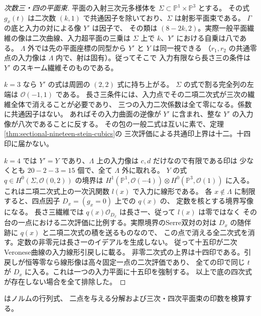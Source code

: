 \begin{proof}[次数三・四の平面束]
平面の入射三次元多様体を $\Sigma\subset\mathbb P^1\times\mathbb P^3$ とする。
その式 $g_x(t)$ は二次数 $(k,1)$ で共通因子を除いており、$\Sigma$ は射影平面束である。
$\Gamma$ の底と入力の対による像 $Y'$ は因子で、
その類は $(8-2k,2)$。実際一般平面繊維の像は二次曲線、入力超平面の三乗は
$\Sigma$ 上で $k$、$Y'$ における自乗は八である。
$\Lambda$ 外では先の平面座標の同型から $Y'$ と $Y$ は同一視できる
（$r_1,r_2$ の共通零点の入力像は $\Lambda$ 内で、射は固有）。従ってそこで
入力有限なら長さ三の条件は $Y'$ のスキーム繊維そのものである。

$k=3$ なら $Y'$ の式は周囲の $(2,2)$ 式に持ち上がる。
$\Sigma$ の式で割る完全列の左端は $\mathcal O(-1,1)$ である。
長さ三条件には、入力点でその二項二次式が三次の繊維全体で消えることが必要であり、
三つの入力二次係数は全て零になる。係数に共通因子はない。
あればその入力曲面の逆像が $Y'$ に含まれ、整な $Y'$ の入力像が八次であることに反する。
その包の一般二式は互いに素で、定理\ref{thm:sectional-nineteen-stein-cubics}の
三次評価による共通印上界は十二。十四印に届かない。

$k=4$ では $Y'=Y$ であり、$\Lambda$ 上の入力像は $c,d$ だけなので有限である印は
少なくとも $20-2-3=15$ 個で、全て $\Lambda$ 外に取れる。
$Y$ の式 $q\in H^0(\Sigma,\mathcal O(0,2))$ の境界は
$H^1(\mathbb P^1,\mathcal O(-4))\otimes H^0(\mathbb P^3,\mathcal O(1))$
に入る。これは二項二次式上の一次汎関数 $l(x)$ で入力に線形である。
各 $x\notin\Lambda$ に制限すると、四点因子 $D_x=(g_x=0)$ 上での $q(x)$ の、
定数を核とする境界写像になる。
長さ三繊維では $q(x)\mathcal O_{D_x}$ は長さ一、従って $l(x)$ は零ではなく
その台の一点における二次評価に比例する。実際境界のSerre双対の対は
$D_x$ の随伴跡に $q(x)$ と二項二次式の積を送るものなので、
この点で消える全二次式を消す。定数の非零元は長さ一のイデアルを生成しない。
従って十五印が二次Veronese曲線の入力線形引戻しに載る。
非零二次式の上界は十四印である。引戻しが恒等零なら線形像は高々固定一点の二次評価であり、
全ての印で同じ $t$ が $D_x$ に入る。これは一つの入力平面に十五印を強制する。
以上で底の四次式が存在しない場合を全て排除した。
\end{proof}
 はノルムの行列式、
二点を与える分解および三次・四次平面束の印数を検算する。
